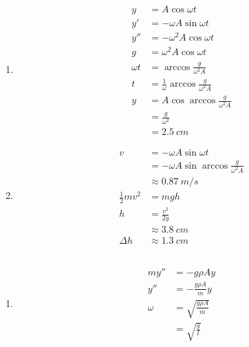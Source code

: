 \documentclass{article}
\begin{document}
\begin{enumerate}
  \item

        \begin{align*}
          y        & = A \cos \omega t                               \\
          y'       & = -\omega A \sin \omega t                       \\
          y''      & = -\omega^2 A \cos \omega t                     \\
          g        & = \omega^2 A \cos \omega t                      \\
          \omega t & = \arccos \frac{g}{\omega^2 A}                  \\
          t        & = \frac{1}{\omega} \arccos \frac{g}{\omega^2 A} \\
          y        & = A \cos \arccos \frac{g}{\omega^2 A}           \\
                   & = \frac{g}{\omega^2}                            \\
                   & = \qty{2.5}{cm}
        \end{align*}

  \item

        \begin{align*}
          v                 & = -\omega A \sin \omega t                     \\
                            & = -\omega A \sin \arccos \frac{g}{\omega^2 A} \\
                            & \approx \qty{0.87}{m/s}                       \\
          \frac{1}{2} m v^2 & = m g h                                       \\
          h                 & = \frac{v^2}{2 g}                             \\
                            & \approx \qty{3.8}{cm}                         \\
          \Delta h          & \approx \qty{1.3}{cm}
        \end{align*}
\end{enumerate}

\subsection{}

\begin{enumerate}
  \item

        \begin{align*}
          m y''  & = -g \rho A y               \\
          y''    & = -\frac{g \rho A}{m} y     \\
          \omega & = \sqrt{\frac{g \rho A}{m}} \\
                 & = \sqrt{\frac{g}{l}}
        \end{align*}
\end{enumerate}
\end{document}
